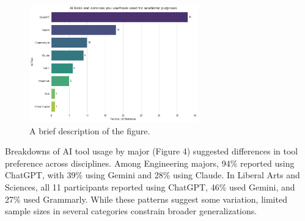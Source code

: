 \documentclass[12pt]{article}
\begin{document}
\begin{figure}[htbp]
  \centering
  \includegraphics[width=0.65\textwidth]{fig3.png} %
  \caption{A brief description of the figure.}
  \label{fig:example1}
\end{figure}

Breakdowns of AI tool usage by major (Figure 4) suggested differences in tool preference across disciplines. Among Engineering majors, 94\% reported using ChatGPT, with 39\% using Gemini and 28\% using Claude. In Liberal Arts and Sciences, all 11 participants reported using ChatGPT, 46\% used Gemini, and 27\% used Grammarly. While these patterns suggest some variation, limited sample sizes in several categories constrain broader generalizations.
\end{document}
